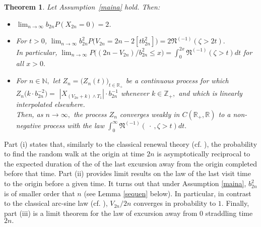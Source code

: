 \documentclass[12pt]{amsart}
\newtheorem{theorem}{Theorem} \makeatletter
\begin{document}
\begin{theorem}
\label{lastvislastexc}
Let Assumption~\ref{maina} hold. Then:
\begin{itemize}
\item [(i)] $\lim_{n \to \infty} b_{2n} P(X_{2n}=0)=2$.
\item [(ii)]
For $t>0$, $\displaystyle \lim_{n\to \infty} b_{2n}^2 P\bigl(V_{2n}=2n-2[tb_{2n}^2]\bigr)=
2{{\mathfrak N}}^{(-1)}(\zeta>2t).$
\\
In particular, $\lim_{n\to\infty}P\bigl((2n-V_{2n})/b_{2n}^2\leq x\bigr)=\int_0^{2x}
{{\mathfrak N}}^{(-1)}(\zeta>t)dt$ for all $x>0.$
\item [(iii)] For $n\in{{\mathbb N}},$ let $Z_n=\bigl(Z_n(t)\bigr)_{t\in {{\mathbb R}}_+}$ be a continuous process for which
$Z_n\bigl(k\cdot b_{2n}^{-2}\bigr)=$ $|X_{(V_{2n}+k)\wedge T_1}|\cdot b_{2n}^{-1}$ whenever $k \in {{\mathbb Z}}_+,$ and which is
linearly interpolated elsewhere.
\\
Then, as $n\to\infty,$ the process $Z_n$ converges weakly in
$C({{\mathbb R}}_+,{{\mathbb R}})$ to a non-negative process with the law $\displaystyle \int_0^{\infty}{{\mathfrak N}}^{(-1)}(~\cdot~,\zeta>t)dt.$
\end{itemize}
\end{theorem}
Part (i) states that, similarly to the classical renewal theory (cf.
\cite{feller1,feller2}), the probability to find the random walk at
the origin at time $2n$ is asymptotically reciprocal to the expected
duration of the of the last excursion away from the origin completed
before that time. Part (ii) provides limit results on the law of the
last visit time to the origin before a given time. It turns out that
under Assumption \ref{maina}, $b_{2n}^2$ is of smaller order that
$n$ (see Lemma \ref{sequen} below).  In particular, in contrast to
the classical arc-sine law (cf. \cite[p.~196]{durrett}), $V_{2n}/2n$
converges in probability to $1$. Finally, part (iii) is a limit
theorem for the law of excursion away from 0 straddling time $2n.$
\end{document}
